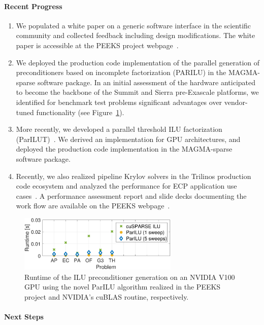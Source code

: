 \paragraph{Recent Progress}
\begin{enumerate}
\item
We populated a white paper on a generic software interface in the scientific 
community and collected feedback including design modifications. The white paper 
is accessible at the PEEKS project webpage~\cite{peekswebpage}.
\item 
We deployed the production code implementation of the parallel 
generation of preconditioners based on incomplete factorization (PARILU) in the 
MAGMA-sparse software package. In an 
initial assessment of the hardware anticipated to become the backbone of the 
Summit and Sierra pre-Exascale platforms, we identified for benchmark test 
problems significant advantages over vendor-tuned functionality (see 
Figure~\ref{fig:ILUperf}).
\item
More recently, we developed a parallel threshold ILU factorization 
(ParILUT)~\cite{doi:10.1137/16M1079506}. We derived an implementation for GPU 
architectures, and deployed the production code implementation in the 
MAGMA-sparse software package.
\item 
Recently, we also realized pipeline Krylov solvers in the Trilinos 
production code ecosystem and analyzed the performance for ECP application use 
cases~\cite{1204}. A performance assessment report and slide decks documenting 
the work flow are available on the PEEKS 
webpage~\cite{peekswebpage}. 
\end{enumerate}

\begin{figure}[htb]
	\centering
	\includegraphics[width=3in]{projects/2.3.3-MathLibs/2.3.3.13-CLOVER/runtime2}
	\caption{\label{fig:ILUperf}Runtime of the ILU preconditioner generation on 
	an NVIDIA V100 GPU using the novel ParILU algorithm realized in the PEEKS 
	project and NVIDIA's cuBLAS routine, respectively.}
\end{figure}


\paragraph{Next Steps}


